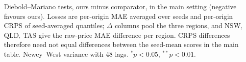 \providecommand{\materialsdir}{.}
\begin{table}[t]
  \centering
  \caption{Diebold--Mariano tests, ours minus comparator, in the main setting
    (negative favours ours). Losses are per-origin MAE averaged over seeds and
    per-origin CRPS of seed-averaged quantiles; $\Delta$ columns pool the
    three regions, and NSW, QLD, TAS give the raw-price MAE difference per
    region. CRPS differences therefore need not equal differences between
    the seed-mean scores in the main table. Newey--West variance with 48
    lags. $^{*}p<0.05$, $^{**}p<0.01$.}
  \label{tab:significance}
  \small
  
\end{table}

